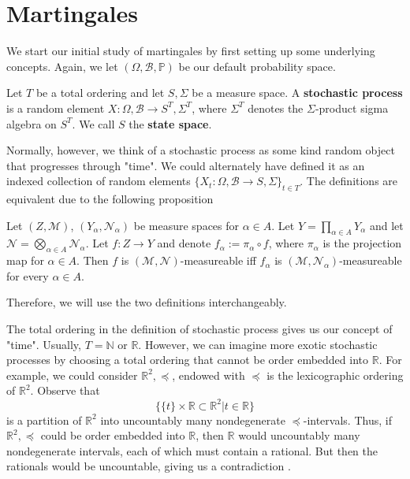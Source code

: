 \section{Martingales}
\label{stoch:martingales}

We start our initial study of martingales by first setting up some underlying concepts. Again, we let \((\Omega, \mathcal{B}, \mathbb{P})\) be our default probability space.

\begin{definition}
    Let \(T\) be a total ordering and let \(S, \Sigma\) be a measure space. A \textbf{stochastic process} is a random element \(X: \Omega, \mathcal{B} \to S^{T}, \Sigma^{T}\), where \(\Sigma^{T}\) denotes the \(\Sigma\)-product sigma algebra on \(S^{T}\). We call \(S\) the \textbf{state space}.
\end{definition}

Normally, however, we think of a stochastic process as some kind random object that progresses through "time". We could alternately have defined it as an indexed collection of random elements \(\{X_{t}: \Omega, \mathcal{B} \to S, \Sigma\}_{t \in T}\). The definitions are equivalent due to the following proposition

\begin{proposition}
    Let \((Z, \mathcal{M})\), $(Y_{\alpha}, \mathcal{N}_\alpha)$ be measure spaces for $\alpha \in A$. Let $Y = \prod\limits_{\alpha \in A} Y_\alpha$ and let $\mathcal{N} = \bigotimes\limits_{\alpha \in A} \mathcal{N}_\alpha$. Let $f : Z \to Y$ and denote $f_{\alpha} := \pi_{\alpha} \circ f$, where $\pi_\alpha$ is the projection map for $\alpha \in A$. Then $f$ is $(\mathcal{M}, \mathcal{N})$-measureable iff $f_\alpha$ is $(\mathcal{M}, \mathcal{N}_\alpha)$-measureable for every $\alpha \in A$.
\end{proposition}

Therefore, we will use the two definitions interchangeably.

The total ordering in the definition of stochastic process gives us our concept of "time". Usually, \(T = \mathbb{N}\) or \(\mathbb{R}\). However, we can imagine more exotic stochastic processes by choosing a total ordering that cannot be order embedded into \(\mathbb{R}\). For example, we could consider \(\mathbb{R}^{2}, \preccurlyeq\), endowed with \(\preccurlyeq\) is the lexicographic ordering of \(\mathbb{R}^{2}\). Observe that 
\[\{\{t\} \times \mathbb{R} \subset \mathbb{R}^{2} | t \in \mathbb{R}\}\]
is a partition of \(\mathbb{R}^{2}\) into uncountably many nondegenerate \(\preccurlyeq\)-intervals. Thus, if \(\mathbb{R}^{2}, \preccurlyeq\) could be order embedded into \(\mathbb{R}\), then \(\mathbb{R}\) would uncountably many nondegenerate intervals, each of which must contain a rational. But then the rationals would be uncountable, giving us a contradiction \cite{exotic_order}.

